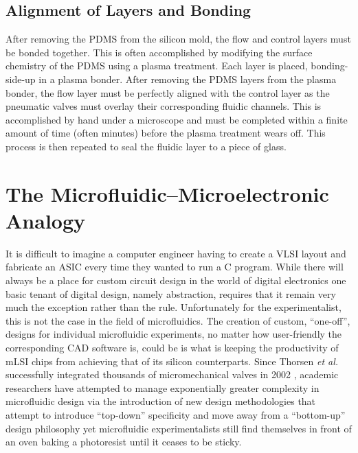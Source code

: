 \subsection{Alignment of Layers and Bonding}
After removing the PDMS from the silicon mold, the flow and control layers must be bonded together. This is often accomplished by modifying the surface chemistry of the PDMS using a plasma treatment. Each layer is placed, bonding-side-up in a plasma bonder. After removing the PDMS layers from the plasma bonder, the flow layer must be perfectly aligned with the control layer as the pneumatic valves must overlay their corresponding fluidic channels. This is accomplished by hand under a microscope and must be completed within a finite amount of time (often minutes) before the plasma treatment wears off. This process is then repeated to seal the fluidic layer to a piece of glass. 

\section{The Microfluidic--Microelectronic Analogy}
\label{sec:backgroundCFRouting}

It is difficult to imagine a computer engineer having to create a VLSI layout and fabricate an ASIC every time they wanted to run a C program. While there will always be a place for custom circuit design in the world of digital electronics one basic tenant of digital design, namely abstraction, requires that it remain very much the exception rather than the rule. Unfortunately for the experimentalist, this is not the case in the field of microfluidics. The creation of custom, ``one-off'', designs for individual microfluidic experiments, no matter how user-friendly the corresponding CAD software is, could be is what is keeping the productivity of mLSI chips from achieving that of its silicon counterparts. Since Thorsen \emph{et al.} successfully integrated thousands of micromechanical valves in 2002 \cite{thorsen2002}, academic researchers have attempted to manage exponentially greater complexity in microfluidic design via the introduction of new design methodologies that attempt to introduce ``top-down'' specificity and move away from a ``bottom-up'' design philosophy \cite{minhass2013}\cite{melin2007}\cite{minhass2012} yet microfluidic experimentalists still find themselves in front of an oven baking a photoresist until it ceases to be sticky. 

